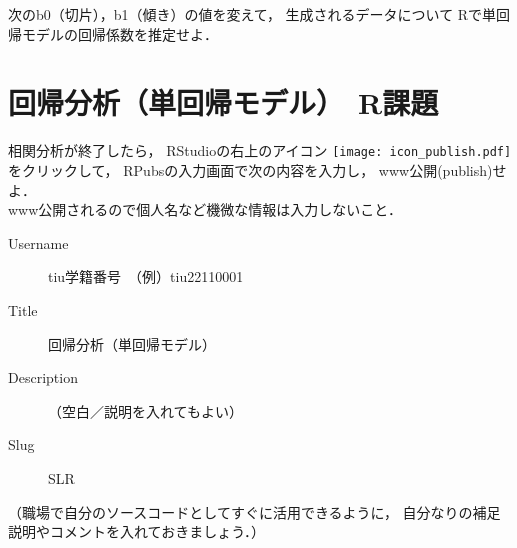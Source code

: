 \MyFrame{\insertsection}
{
  次のb0（切片），b1（傾き）の値を変えて，
  生成されるデータについて
  Rで単回帰モデルの回帰係数を推定せよ．
}

\section{回帰分析（単回帰モデル）　R課題}

\MyFrame{\insertsection}
{
  相関分析が終了したら，
  RStudioの右上のアイコン
  \texttt{[image: icon\_publish.pdf]}をクリックして，
  RPubsの入力画面で次の内容を入力し，
  www公開(publish)せよ．\\
  \alert{www公開されるので個人名など機微な情報は入力しないこと．}
  \begin{description}
    \item[Username] tiu学籍番号　（例）tiu22110001\\
    \item[Title] 回帰分析（単回帰モデル）\\
    \item[Description] （空白／説明を入れてもよい）\\
    \item[Slug] SLR
  \end{description}
  （職場で自分のソースコードとしてすぐに活用できるように，
    自分なりの補足説明やコメントを入れておきましょう．）
}


